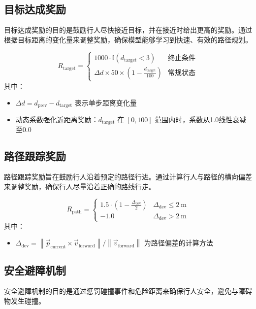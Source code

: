 \subsection{目标达成奖励}
目标达成奖励的目的是鼓励行人尽快接近目标，并在接近时给出更高的奖励。通过根据目标距离的变化量来调整奖励，确保模型能够学习到快速、有效的路径规划。

\begin{equation}
R_{\text{target}} =
\begin{cases}
1000 \cdot \mathbb{I}(d_{\text{target}}<3) & \text{终止条件} \\
\Delta d \times 50 \times \left(1 - \frac{d_{\text{target}}}{100}\right) & \text{常规状态}
\end{cases}
\end{equation}
其中：
\begin{itemize}
    \item \( \Delta d = d_{\text{prev}} - d_{\text{target}} \) 表示单步距离变化量
    \item 动态系数强化近距离奖励：\( d_{\text{target}} \) 在 \([0, 100]\) 范围内时，系数从1.0线性衰减至0.0
\end{itemize}

\subsection{路径跟踪奖励}
路径跟踪奖励旨在鼓励行人沿着预定的路径行进。通过计算行人与路径的横向偏差来调整奖励，确保行人尽量沿着正确的路线行走。

\begin{equation}
R_{\text{path}} =
\begin{cases}
1.5 \cdot \left(1 - \frac{\Delta_{\text{dev}}}{2}\right) & \Delta_{\text{dev}} \leq 2\ \text{m} \\
-1.0 & \Delta_{\text{dev}} > 2\ \text{m}
\end{cases}
\end{equation}
其中：
\begin{itemize}
    \item \( \Delta_{\text{dev}} = \left\| \vec{p}_{\text{current}} \times \vec{v}_{\text{forward}} \right\| / \left\| \vec{v}_{\text{forward}} \right\| \) 为路径偏差的计算方法
\end{itemize}

\subsection{安全避障机制}
安全避障机制的目的是通过惩罚碰撞事件和危险距离来确保行人安全，避免与障碍物发生碰撞。

